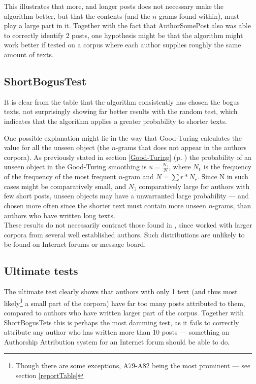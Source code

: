 This illustrates that more, and longer posts does not necessary make the algorithm better, but that the contents (and the $n$-grams found within), must play a large part in it. Together with the fact that AuthorSomePost also was able to correctly identify 2 posts, one hypothesis might be that the algorithm might work better if tested on a corpus where each author supplies roughly the same amount of texts.  

\subsection{ShortBogusTest}
It is clear from the table that the algorithm consistently has chosen the bogus texts, not surprisingly showing far better results with the random test, which indicates that the algorithm applies a greater probability to shorter texts.

One possible explanation might lie in the way that Good-Turing calculates the value for all the unseen object (the $n$-grams that does not appear in the authors corpora). As previously stated in section \ref{Good-Turing} (p. \pageref{Good-Turing}) the probability of an unseen object in the Good-Turing smoothing is $u =\frac{N_1}{N}$, where $N_1$ is the frequency of the frequency of the most frequent $n$-gram and $N =\sum r * N_r$. Since N in such cases might be comparatively small, and $N_1$ comparatively large for authors with few short posts, unseen objects may have a unwarranted large probability --- and chosen more often since the shorter text must contain more unseen $n$-grams, than authors who have written long texts.\\

These results do not necessarily contract those found in \cite{nr4}, since \cite{nr4} worked with larger corpora from several well established authors. Such distributions are unlikely to be found on Internet forums or message board. 

\subsection{Ultimate tests}
The ultimate test clearly shows that authors with only 1 text (and thus most likely\footnote{Though there are some exceptions, A79-A82 being the most prominent --- see section \ref{reportTable}} a small part of the corpora) have far too many posts attributed to them, compared to authors who have written larger part of the corpus. Together with ShortBogusTets this is perhaps the most damming test, as it fails to correctly attribute any author who has written more than 10 posts --- something an Authorship Attribution system for an Internet forum should be able to do. 

